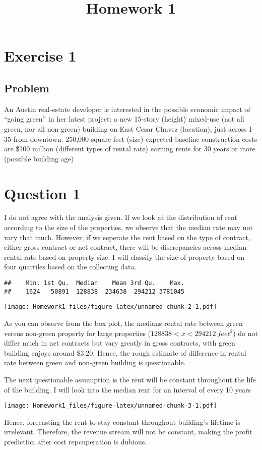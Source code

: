 \documentclass[]{article}
\title{Homework 1}
\author{}
\date{}
\begin{document}
\maketitle

\section{Exercise 1}\label{exercise-1}

\subsection{Problem}\label{problem}

An Austin real-estate developer is interested in the possible economic
impact of ``going green'' in her latest project: a new 15-story (height)
mixed-use (not all green, nor all non-green) building on East Cesar
Chavez (location), just across I-35 from downtown. 250,000 square feet
(size) expected baseline construction costs are \$100 million (different
types of rental rate) earning rents for 30 years or more (possible
building age)

\section{Question 1}\label{question-1}

I do not agree with the analysis given. If we look at the distribution
of rent according to the size of the properties, we observe that the
median rate may not vary that much. However, if we seperate the rent
based on the type of contract, either gross contract or net contract,
there will be discrepancies across median rental rate based on property
size. I will classify the size of property based on four quartiles based
on the collecting data.

\begin{verbatim}
##    Min. 1st Qu.  Median    Mean 3rd Qu.    Max. 
##    1624   50891  128838  234638  294212 3781045
\end{verbatim}

\texttt{[image: Homework1\_files/figure-latex/unnamed-chunk-2-1.pdf]}

As you can observe from the box plot, the medians rental rate between
green versus non-green property for large properties
(\(128838 <x< 294212 \ {feet^{2}}\)) do not differ much in net contracts
but vary greatly in gross contracts, with green building enjoys around
\$3.20. Hence, the rough estimate of difference in rental rate between
green and non-green building is questionable.

The next questionable assumption is the rent will be constant throughout
the life of the building. I will look into the median rent for an
interval of every 10 years

\texttt{[image: Homework1\_files/figure-latex/unnamed-chunk-3-1.pdf]}

Hence, forecasting the rent to stay constant throughout building's
lifetime is irrelevant. Therefore, the revenue stream will not be
constant, making the profit prediction after cost repcuperation is
dubious.
\end{document}
